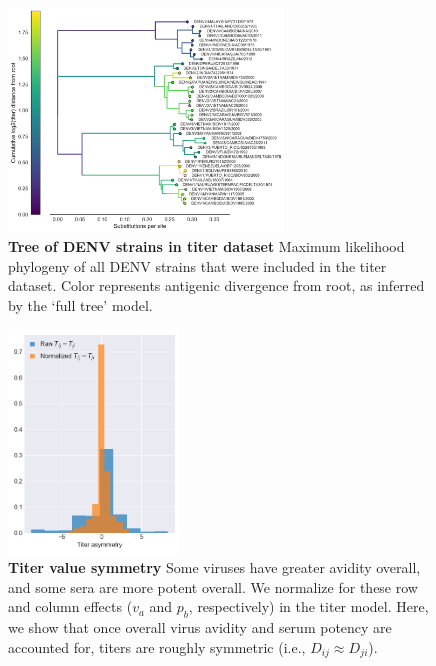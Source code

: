 \documentclass[11pt,oneside,letterpaper]{article}
\begin{document}
\begin{figure}[h]
\centering
	\includegraphics[width=0.65\textwidth]{../figures/png/titered_strains_tree.png}
	\caption{\textbf{Tree of DENV strains in titer dataset}
  Maximum likelihood phylogeny of all DENV strains that were included in the titer dataset. Color represents antigenic divergence from root, as inferred by the `full tree' model.
	}
	\label{titered_strains_tree}
\end{figure}

\begin{figure}[h]
  \centering
  \includegraphics[width=0.4\textwidth]{../figures/png/titer_asymmetry.png}
  \caption{\textbf{Titer value symmetry}
  Some viruses have greater avidity overall, and some sera are more potent overall.
  We normalize for these row and column effects ($v_a$ and $p_b$, respectively) in the titer model.
  Here, we show that once overall virus avidity and serum potency are accounted for, titers are roughly symmetric (i.e., $D_{ij} \approx D_{ji}$).
  }
\label{titer_asymmetry}
\end{figure}
\end{document}
